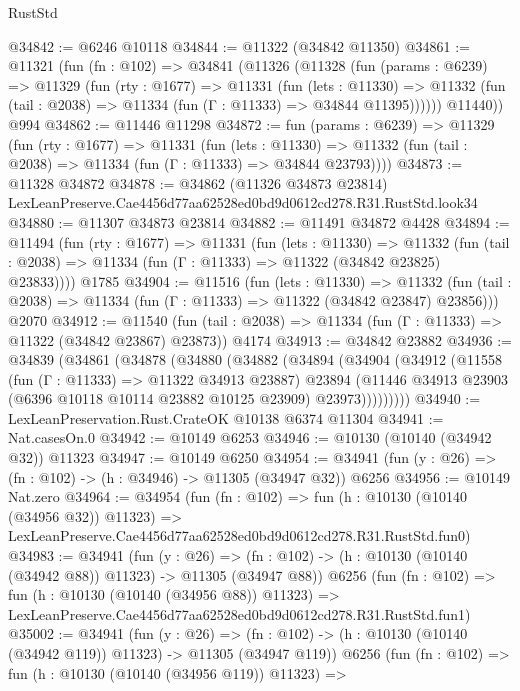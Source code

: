 \begin{lexlean}{RustStd}
\begin{coremodule}
@34842 := @6246 @10118
@34844 := @11322 (@34842 @11350)
@34861 := @11321
    (fun (fn : @102) =>
    @34841
      (@11326
        (@11328
          (fun (params : @6239) =>
          @11329
            (fun (rty : @1677) =>
            @11331
              (fun (lets : @11330) =>
              @11332 (fun (tail : @2038) => @11334 (fun (Γ : @11333) => @34844 @11395))))))
        @11440))
    @994
@34862 := @11446 @11298
@34872 := fun (params : @6239) =>
  @11329
    (fun (rty : @1677) =>
    @11331
      (fun (lets : @11330) =>
      @11332 (fun (tail : @2038) => @11334 (fun (Γ : @11333) => @34844 @23793))))
@34873 := @11328 @34872
@34878 := @34862
    (@11326 @34873 @23814)
    LexLeanPreserve.Cae4456d77aa62528ed0bd9d0612cd278.R31.RustStd.look34
@34880 := @11307 @34873 @23814
@34882 := @11491 @34872 @4428
@34894 := @11494
    (fun (rty : @1677) =>
    @11331
      (fun (lets : @11330) =>
      @11332 (fun (tail : @2038) => @11334 (fun (Γ : @11333) => @11322 (@34842 @23825) @23833))))
    @1785
@34904 := @11516
    (fun (lets : @11330) =>
    @11332 (fun (tail : @2038) => @11334 (fun (Γ : @11333) => @11322 (@34842 @23847) @23856)))
    @2070
@34912 := @11540
    (fun (tail : @2038) => @11334 (fun (Γ : @11333) => @11322 (@34842 @23867) @23873))
    @4174
@34913 := @34842 @23882
@34936 := @34839
    (@34861
      (@34878
        (@34880
          (@34882
            (@34894
              (@34904
                (@34912
                  (@11558
                    (fun (Γ : @11333) => @11322 @34913 @23887)
                    @23894
                    (@11446 @34913 @23903 (@6396 @10118 @10114 @23882 @10125 @23909) @23973)))))))))
@34940 := LexLeanPreservation.Rust.CrateOK @10138 @6374 @11304
@34941 := Nat.casesOn.{0}
@34942 := @10149 @6253
@34946 := @10130 (@10140 (@34942 @32)) @11323
@34947 := @10149 @6250
@34954 := @34941 (fun (y : @26) => (fn : @102) -> (h : @34946) -> @11305 (@34947 @32)) @6256
@34956 := @10149 Nat.zero
@34964 := @34954
    (fun (fn : @102) =>
    fun (h : @10130 (@10140 (@34956 @32)) @11323) =>
    LexLeanPreserve.Cae4456d77aa62528ed0bd9d0612cd278.R31.RustStd.fun0)
@34983 := @34941
    (fun (y : @26) =>
    (fn : @102) -> (h : @10130 (@10140 (@34942 @88)) @11323) -> @11305 (@34947 @88))
    @6256
    (fun (fn : @102) =>
    fun (h : @10130 (@10140 (@34956 @88)) @11323) =>
    LexLeanPreserve.Cae4456d77aa62528ed0bd9d0612cd278.R31.RustStd.fun1)
@35002 := @34941
    (fun (y : @26) =>
    (fn : @102) -> (h : @10130 (@10140 (@34942 @119)) @11323) -> @11305 (@34947 @119))
    @6256
    (fun (fn : @102) =>
    fun (h : @10130 (@10140 (@34956 @119)) @11323) =>

\end{coremodule}
\end{lexlean}
